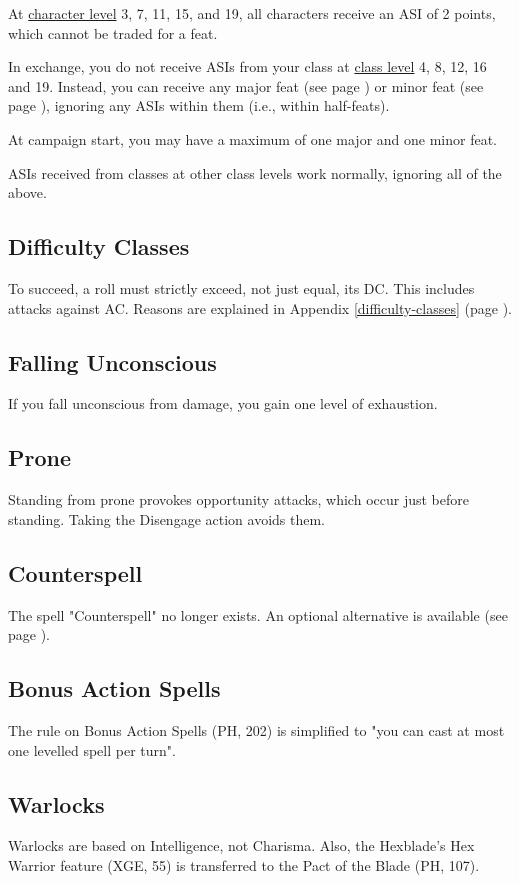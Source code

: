 \documentclass[letterpaper,twocolumn,openany,nodeprecatedcode,bg=print]{dndbook}
\newcommand{\pg}[1]{page \pageref{#1}}
\newcommand{\see}[1]{(see \pg{#1})}
\begin{document}
At \underline{character level} 3, 7, 11, 15, and 19, all characters receive an ASI of 2 points, which cannot be traded for a feat.

In exchange, you do not receive ASIs from your class at \underline{class level} 4, 8, 12, 16 and 19. Instead, you can receive any major feat \see{major-feats-table} or minor feat \see{minor-feats-table}, ignoring any ASIs within them (i.e., within half-feats).

At campaign start, you may have a maximum of one major and one minor feat.

ASIs received from classes at other class levels work normally, ignoring all of the above.

\subsection{Difficulty Classes}
To succeed, a roll must strictly exceed, not just equal, its DC. 
This includes attacks against AC. 
Reasons are explained in Appendix \ref{difficulty-classes} (\pg{difficulty-classes}).

\subsection{Falling Unconscious}
If you fall unconscious from damage, you gain one level of exhaustion.

\subsection{Prone}
Standing from prone provokes opportunity attacks, which occur just before standing. 
Taking the Disengage action avoids them.

\subsection{Counterspell}
The spell "Counterspell" no longer exists. 
An optional alternative is available \see{counterspell}.

\subsection{Bonus Action Spells}
The rule on Bonus Action Spells (PH, 202) is simplified to
"you can cast at most one levelled spell per turn".

\subsection{Warlocks}
Warlocks are based on Intelligence, not Charisma. 
Also, the Hexblade's Hex Warrior feature (XGE, 55) is transferred to the Pact of the Blade (PH, 107).
\end{document}
